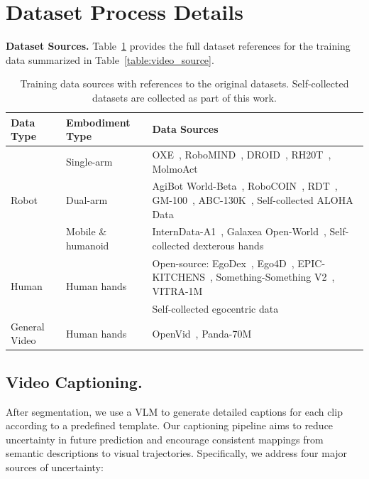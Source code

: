 \newpage
\appendix

\section{Dataset Process Details}\label{app_data}

\textbf{Dataset Sources.} Table~\ref{table:video_source_full} provides the full dataset references for the training data summarized in Table~\ref{table:video_source}.

\begin{table}[H]
    \centering
    \small
    \setlength{\tabcolsep}{4pt}
    \renewcommand{\arraystretch}{1}
    \begin{tabularx}{\linewidth}{@{}llX@{}}
        \toprule
        Data Type & Embodiment Type & Data Sources \\
        \midrule
        \multirow{3}{*}{Robot}
        & Single-arm
        & OXE~\citep{collaboration2023openx}, RoboMIND~\citep{wu2025robomind}, DROID~\citep{khazatsky2024droid}, RH20T~\citep{fang2024rh20t}, MolmoAct~\citep{lee2025molmoact} \\
        & Dual-arm
        & AgiBot World-Beta~\citep{bu2025agibot}, RoboCOIN~\citep{wu2025robocoin}, RDT~\citep{liu2024rdt}, GM-100~\citep{wang2026gm100}, ABC-130K~\citep{allshire2026abc}, Self-collected ALOHA Data\\
        & Mobile \& humanoid
        & InternData-A1~\citep{tian2025interndata}, Galaxea Open-World~\citep{jiang2025galaxea}, Self-collected dexterous hands \\
        \midrule
        \multirow{2}{*}{Human}
        & \multirow{2}{*}{Human hands}
        & Open-source: EgoDex~\citep{hoque2025egodex}, Ego4D~\citep{grauman2022ego4d}, EPIC-KITCHENS~\citep{damen2018epic}, Something-Something V2~\citep{goyal2017something,mahdisoltani2018granularity}, VITRA-1M~\citep{li2025vitra} \\
        & & Self-collected egocentric data\\
        \midrule
        General Video
        & Human hands
        & OpenVid~\citep{nan2025openvid}, Panda-70M~\citep{chen2024panda} \\
        \bottomrule
    \end{tabularx}
    \caption{Training data sources with references to the original datasets. Self-collected datasets are collected as part of this work.}
    \label{table:video_source_full}
\end{table}

\subsection{Video Captioning.}\label{app_video}
After segmentation, we use a VLM to generate detailed captions for each clip according to a predefined template. Our captioning pipeline aims to reduce uncertainty in future prediction and encourage consistent mappings from semantic descriptions to visual trajectories. Specifically, we address four major sources of uncertainty:

